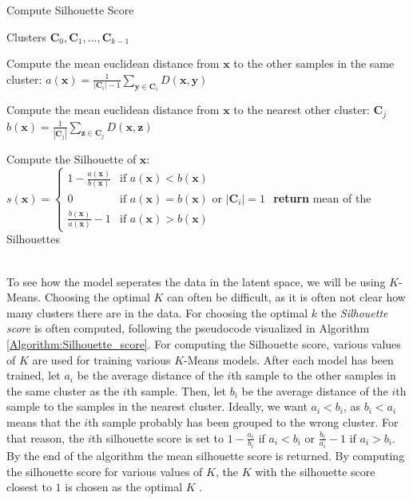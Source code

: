\documentclass[./main.tex]{subfiles}
\begin{document}
\begin{algorithm}[htbp]
    \caption{Compute Silhouette Score \cite{MAD_L12}}
    \label{Algorithm:Silhouette_score}
    \begin{algorithmic}[1]
        \Require Clusters $\bm{C}_0, \bm{C}_1, ..., \bm{C}_{k - 1}$
                \State \begin{varwidth}[t]{\linewidth}
                    Compute the mean euclidean distance from $\bm{x}$ to the other samples in the same cluster: $a(\bm{x}) = \frac{1}{|\bm{C}_i| - 1} \sum_{\bm{y} \in \bm{C}_i} D(\bm{x}, \bm{y})$
                \end{varwidth}
                \State \begin{varwidth}[t]{\linewidth}
                Compute the mean euclidean distance from $\bm{x}$ to the nearest other cluster: $\bm{C}_j$ $b(\bm{x}) = \frac{1}{| \bm{C}_j |} \sum_{\bm{z} \in \bm{C}_j} D(\bm{x}, \bm{z})$
                \end{varwidth}
                \State Compute the Silhouette of $\bm{x}$:
                \begin{math}
                    s(\bm{x}) =
                    \begin{cases}
                        1 - \frac{a(\bm{x})}{b(\bm{x})} & \text{if } a(\bm{x}) < b(\bm{x}) \\
                        0 & \text{if } a(\bm{x}) = b(\bm{x}) \text{ or } |\bm{C}_i| = 1 \\
                        \frac{b(\bm{x})}{a(\bm{x})} - 1 & \text{if } a(\bm{x}) > b(\bm{x})
                    \end{cases}
                \end{math}
            \EndFor
        \EndFor
        \State \textbf{return} mean of the Silhouettes
    \end{algorithmic}
\end{algorithm}
\\
To see how the model seperates the data in the latent space, we will be using $K$-Means. Choosing the optimal $K$ can often be difficult, as it is often not clear how many clusters there are in the data. For choosing the optimal $k$ the \textit{Silhouette score} is often computed, following the pseudocode visualized in Algorithm \ref{Algorithm:Silhouette_score}. For computing the Silhouette score, various values of $K$ are used for training various $K$-Means models. After each model has been trained, let $a_i$ be the average distance of the $i$th sample to the other samples in the same cluster as the $i$th sample. Then, let $b_i$ be the average distance of the $i$th sample to the samples in the nearest cluster. Ideally, we want $a_i < b_i$, as $b_i < a_i$ means that the $i$th sample probably has been grouped to the wrong cluster. For that reason, the $i$th silhouette score is set to $1 - \frac{a_i}{b_i}$ if $a_i < b_i$ or $\frac{b_i}{a_i} - 1$ if $a_i > b_i$. By the end of the algorithm the mean silhouette score is returned. By computing the silhouette score for various values of $K$, the $K$ with the silhouette score closest to $1$ is chosen as the optimal $K$ \cite{MAD_L12}.
\end{document}
